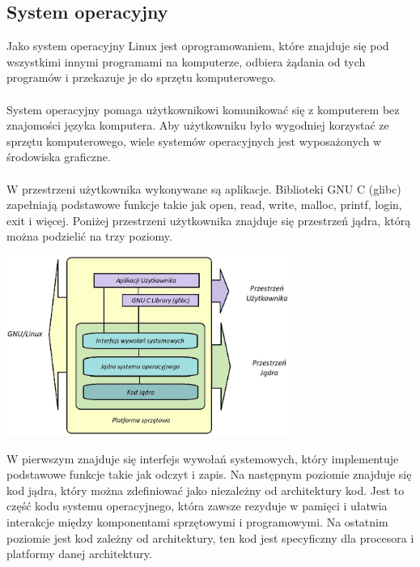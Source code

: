 \documentclass[10pt,a4paper]{report}
\begin{document}
\begin{adjustwidth}{2cm}{2cm}
\section{System operacyjny}
\begin{minipage}{1\linewidth}
Jako system operacyjny Linux jest oprogramowaniem, które znajduje się pod wszystkimi innymi programami na komputerze, odbiera żądania od tych programów i przekazuje je do sprzętu komputerowego. \\ \\
System operacyjny pomaga użytkownikowi komunikować się z komputerem bez znajomości języka komputera. Aby użytkowniku było wygodniej korzystać ze sprzętu komputerowego, wiele systemów operacyjnych jest wyposażonych w środowiska graficzne. \\ \\
W przestrzeni użytkownika wykonywane są aplikacje. Biblioteki GNU C (glibc) zapełniają podstawowe funkcje takie jak open, read, write, malloc, printf, login, exit  i więcej. Poniżej przestrzeni użytkownika znajduje się przestrzeń jądra, którą można podzielić na trzy poziomy.
\end{minipage}
\begin{minipage}{\linewidth}
\vspace{0.3cm}
\begin{center}
  \includegraphics[width=350px]{img/linux-architektura} 
\end{center}
\end{minipage}
\begin{minipage}{1\linewidth}
\vspace{0.3cm}
 W pierwszym znajduje się interfejs wywołań systemowych, który implementuje podstawowe funkcje takie jak odczyt i zapis. Na następnym poziomie znajduje się kod jądra, który można zdefiniować jako niezależny od architektury kod. Jest to część kodu systemu operacyjnego, która zawsze rezyduje w pamięci i ułatwia interakcje między komponentami sprzętowymi i programowymi. Na ostatnim poziomie jest kod zależny od architektury,  ten kod jest specyficzny dla procesora i platformy danej architektury.\\ 

\end{minipage}
\end{adjustwidth}
\end{document}
